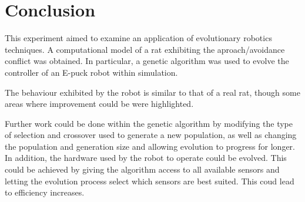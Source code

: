 \section{Conclusion} %

This experiment aimed to examine an application of evolutionary robotics techniques. A computational model of a rat exhibiting the aproach/avoidance conflict was obtained. In particular, a genetic algorithm was used to evolve the controller of an E-puck robot within simulation.

The behaviour exhibited by the robot is similar to that of a real rat, though some areas where improvement could be were highlighted.

Further work could be done within the genetic algorithm by modifying the type of selection and crossover used to generate a new population, as well as changing the population and generation size and allowing evolution to progress for longer. In addition, the hardware used by the robot to operate could be evolved. This could be achieved by giving the algorithm access to all available sensors and letting the evolution process select which sensors are best suited. This coud lead to efficiency increases.